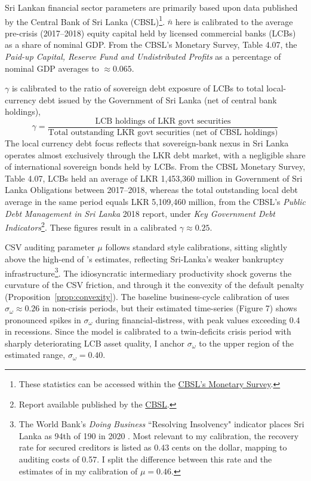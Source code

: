 \documentclass[11pt]{article}
\theoremstyle{definition}
\theoremstyle{plain}
\theoremstyle{remark}
\begin{document}
Sri Lankan financial sector parameters are primarily based upon data published by the Central Bank of Sri Lanka (CBSL)\footnote{These statistics can be accessed within the \href{https://www.cbsl.gov.lk/en/publications/economic-and-financial-reports}{CBSL's Monetary Survey}.}. $\bar n$ here is calibrated to the average pre-crisis (2017--2018) equity capital held by licensed commercial banks (LCBs) as a share of nominal GDP. From the CBSL's Monetary Survey, Table 4.07, the \textit{Paid-up Capital, Reserve Fund and Undistributed Profits} as a percentage of nominal GDP averages to $\approx0.065$.

$\gamma$ is calibrated to the ratio of sovereign debt exposure of LCBs to total local-currency debt issued by the Government of Sri Lanka (net of central bank holdings),
\begin{equation*}
    \gamma=\frac{\text{LCB holdings of LKR govt securities}}{\text{Total outstanding LKR govt securities (net of CBSL holdings)}}
\end{equation*}
The local currency debt focus reflects that sovereign-bank nexus in Sri Lanka operates almost exclusively through the LKR debt market, with a negligible share of international sovereign bonds held by LCBs. From the CBSL Monetary Survey, Table 4.07, LCBs held an average of LKR 1,453,360 million in Government of Sri Lanka Obligations between 2017--2018, whereas the total outstanding local debt average in the same period equals LKR 5,109,460 million, from the CBSL's \textit{Public Debt Management
in Sri Lanka} 2018 report, under \textit{Key Government Debt Indicators}\footnote{Report available published by the \href{https://www.cbsl.gov.lk/sites/default/files/cbslweb_documents/publications/otherpub/public_debt_management_in_sri_lanka_2018.pdf}{ CBSL}.}. These figures result in a calibrated $\gamma\approx 0.25$.

CSV auditing parameter $\mu$ follows standard \citet{bernanke_chapter_1999} style calibrations, sitting slightly above the high-end of \citet{carlstrom_agency_1997}'s estimates, reflecting Sri-Lanka's weaker bankruptcy infrastructure\footnote{The World Bank's \textit{Doing Business} ``Resolving Insolvency" indicator places Sri Lanka as 94th of 190 in 2020 \citep{world_bank_doing_2020}. Most relevant to my calibration, the recovery rate for secured creditors is listed as 0.43 cents on the dollar, mapping to auditing costs of 0.57. I split the difference between this rate and the estimates of \citet{carlstrom_agency_1997} in my calibration of $\mu=0.46$.}.
The idiosyncratic intermediary productivity shock governs the curvature of the CSV friction, and through it the convexity of the default penalty (Proposition~\ref{prop:convexity}). The baseline business-cycle calibration of 
\citet{christiano_risk_2014} uses $\sigma_\omega \approx 0.26$ in non-crisis periods, but their estimated time-series (Figure 7) shows pronounced spikes in $\sigma_\omega$ during financial-distress, with peak values exceeding $0.4$ in recessions. Since the model is calibrated to a twin-deficits crisis period with sharply deteriorating LCB asset quality, I anchor $\sigma_\omega$ to the upper region of the \citet{christiano_risk_2014} estimated range, $\sigma_\omega = 0.40$.
\end{document}
